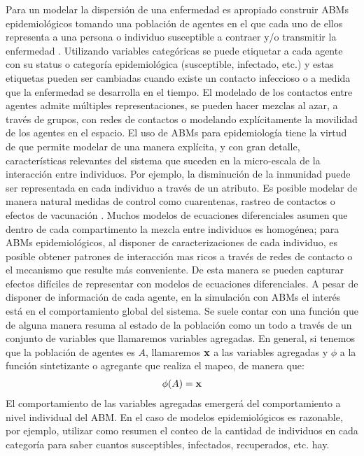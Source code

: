 Para un modelar la dispersión de una enfermedad es apropiado construir ABMs epidemiológicos tomando una población de agentes en el que cada uno de ellos representa a una persona o individuo susceptible a contraer y/o transmitir la enfermedad \citep{Roche2011}. Utilizando variables categóricas se puede etiquetar a cada agente con su status o categoría epidemiológica (susceptible, infectado, etc.) y estas etiquetas pueden ser cambiadas cuando existe un contacto infeccioso o a medida que la enfermedad se desarrolla en el tiempo. El modelado de los contactos entre agentes admite múltiples representaciones, se pueden hacer mezclas al azar, a través de grupos, con redes de contactos o modelando explícitamente la movilidad de los agentes en el espacio. El uso de ABMs para epidemiología tiene la virtud de que permite modelar de una manera explícita, y con gran detalle, características relevantes del sistema que suceden en la micro-escala de la interacción entre individuos. Por ejemplo, la disminución de la inmunidad puede ser representada en cada individuo a través de un atributo. Es posible modelar de manera natural medidas de control como cuarentenas, rastreo de contactos o efectos de vacunación \citep{Silva2020}. Muchos modelos de ecuaciones diferenciales asumen que dentro de cada compartimento la mezcla entre individuos es homogénea; para ABMs epidemiológicos, al disponer de caracterizaciones de cada individuo, es posible obtener patrones de interacción mas ricos a través de redes de contacto o el mecanismo que resulte más conveniente. De esta manera se pueden capturar efectos difíciles de representar con modelos de ecuaciones diferenciales. A pesar de disponer de información de cada agente, en la simulación con ABMs el interés está en el comportamiento global del sistema. Se suele contar con una función que de alguna manera resuma al estado de la población como un todo a través de un conjunto de variables que llamaremos variables agregadas. En general, si tenemos que la población de agentes es $A$, llamaremos $\mathbf{x}$ a las variables agregadas y $\phi$ a la función sintetizante o agregante que realiza el mapeo, de manera que:
\begin{align}
    \phi (A) = \mathbf{x}
\end{align}
El comportamiento de las variables agregadas emergerá del comportamiento a nivel individual del ABM. En el caso de modelos epidemiológicos es razonable, por ejemplo, utilizar como resumen el conteo de la cantidad de individuos en cada categoría para saber cuantos susceptibles, infectados, recuperados, etc. hay.

